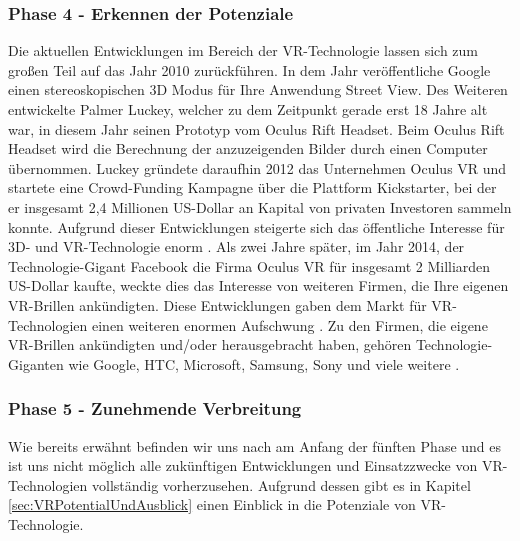 \subsubsection{Phase 4 - Erkennen der Potenziale}
Die aktuellen Entwicklungen im Bereich der VR-Technologie lassen sich zum großen Teil auf das Jahr 2010 zurückführen.
In dem Jahr veröffentliche Google einen stereoskopischen 3D Modus für Ihre Anwendung Street View. Des Weiteren entwickelte Palmer Luckey, welcher zu dem Zeitpunkt gerade erst 18 Jahre alt war, in diesem Jahr seinen Prototyp vom Oculus Rift Headset. Beim Oculus Rift Headset wird die Berechnung der anzuzeigenden Bilder durch einen Computer übernommen. Luckey gründete daraufhin 2012 das Unternehmen Oculus VR und startete eine Crowd-Funding Kampagne über die Plattform Kickstarter, bei der er insgesamt 2,4 Millionen US-Dollar an Kapital von privaten Investoren sammeln konnte. Aufgrund dieser Entwicklungen steigerte sich das öffentliche Interesse für 3D- und VR-Technologie enorm \cite{20}.
\newline
Als zwei Jahre später, im Jahr 2014, der Technologie-Gigant Facebook die Firma Oculus VR für insgesamt 2 Milliarden US-Dollar kaufte, weckte dies das Interesse von weiteren Firmen, die Ihre eigenen VR-Brillen ankündigten. Diese Entwicklungen gaben dem Markt für VR-Technologien einen weiteren enormen Aufschwung \cite{20}.
Zu den Firmen, die eigene VR-Brillen ankündigten und/oder herausgebracht haben, gehören Technologie-Giganten wie Google, HTC, Microsoft, Samsung, Sony und viele weitere \cite{20}.

\subsubsection{Phase 5 - Zunehmende Verbreitung}
Wie bereits erwähnt befinden wir uns nach am Anfang der fünften Phase und es ist uns nicht möglich alle zukünftigen Entwicklungen und Einsatzzwecke von VR-Technologien vollständig vorherzusehen. Aufgrund dessen gibt es in Kapitel \ref{sec:VRPotentialUndAusblick} einen Einblick in die Potenziale von VR-Technologie.

